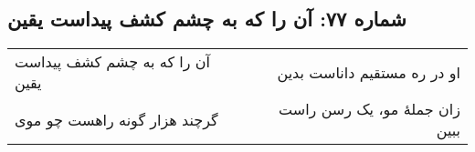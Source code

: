 \begin{center}
\section*{شماره ۷۷: آن را که به چشم کشف پیداست یقین}
\label{sec:077}
\begin{longtable}{l p{0.5cm} r}
آن را که به چشم کشف پیداست یقین
&&
او در ره مستقیم داناست بدین
\\
گرچند هزار گونه راهست چو موی
&&
زان جملهٔ مو، یک رسن راست ببین
\\
\end{longtable}
\end{center}
